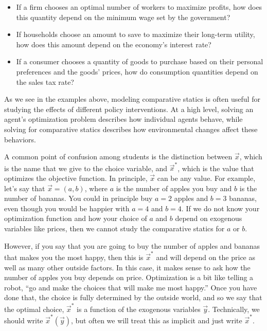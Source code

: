 \begin{itemize}
    \item If a firm chooses an optimal number of workers to maximize profits, how does this quantity depend on the minimum wage set by the government?
    \item If households choose an amount to save to maximize their long-term utility, how does this amount depend on the economy's interest rate?
    \item If a consumer chooses a quantity of goods to purchase based on their personal preferences and the goods' prices, how do consumption quantities depend on the sales tax rate? 
\end{itemize}
As we see in the examples above, modeling comparative statics is often useful for studying the effects of different policy interventions. At a high level, solving an agent's optimization problem describes how individual agents behave, while solving for comparative statics describes how environmental changes affect these behaviors.

A common point of confusion among students is the distinction between $\vec{x}$, which is the name that we give to the choice variable, and $\vec{x}^*$, which is the value that optimizes the objective function. In principle, $\vec{x}$ can be any value. For example, let's say that $\vec{x} = (a, b)$, where $a$ is the number of apples you buy and $b$ is the number of bananas. You could in principle buy $a = 2$ apples and $b = 3$ bananas, even though you would be happier with $a = 4$ and $b = 4$. If we do not know your optimization function and how your choice of $a$ and $b$ depend on exogenous variables like prices, then we cannot study the comparative statics for $a$ or $b$.


However, if you say that you are going to buy the number of apples and bananas that makes you the most happy, then this is $\vec{x}^*$ and will depend on the price as well as many other outside factors. In this case, it makes sense to ask how the number of apples you buy depends on price. Optimization is a bit like telling a robot, ``go and make the choices that will make me most happy.'' Once you have done that, the choice is fully determined by the outside world, and so we say that the optimal choice, $\vec{x}^*$ is a function of the exogenous variables $\vec{y}$. Technically, we should write $\vec{x}^*(\vec{y})$, but often we will treat this as implicit and just write $\vec{x}^*$.

